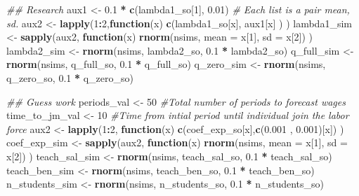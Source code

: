 \documentclass[]{article}
\newenvironment{Shaded}{\begin{snugshade}}{\end{snugshade}}
\newcommand{\CommentTok}[1]{\textcolor[rgb]{0.56,0.35,0.01}{\textit{#1}}}
\newcommand{\ControlFlowTok}[1]{\textcolor[rgb]{0.13,0.29,0.53}{\textbf{#1}}}
\newcommand{\DataTypeTok}[1]{\textcolor[rgb]{0.13,0.29,0.53}{#1}}
\newcommand{\DecValTok}[1]{\textcolor[rgb]{0.00,0.00,0.81}{#1}}
\newcommand{\FloatTok}[1]{\textcolor[rgb]{0.00,0.00,0.81}{#1}}
\newcommand{\KeywordTok}[1]{\textcolor[rgb]{0.13,0.29,0.53}{\textbf{#1}}}
\newcommand{\NormalTok}[1]{#1}
\newcommand{\OperatorTok}[1]{\textcolor[rgb]{0.81,0.36,0.00}{\textbf{#1}}}
\newcommand{\StringTok}[1]{\textcolor[rgb]{0.31,0.60,0.02}{#1}}
\begin{document}
\begin{Shaded}
\begin{Highlighting}[]
{\CommentTok{## Research}
\NormalTok{aux1 <-}\StringTok{ }\FloatTok{0.1} \OperatorTok{*}\StringTok{ }\KeywordTok{c}\NormalTok{(lambda1_so[}\DecValTok{1}\NormalTok{], }\FloatTok{0.01}\NormalTok{)}
\CommentTok{# Each list is a pair mean, sd. }
\NormalTok{aux2 <-}\StringTok{ }\KeywordTok{lapply}\NormalTok{(}\DecValTok{1}\OperatorTok{:}\DecValTok{2}\NormalTok{,}\ControlFlowTok{function}\NormalTok{(x) }\KeywordTok{c}\NormalTok{(lambda1_so[x], aux1[x] ) )}
\NormalTok{lambda1_sim <-}\StringTok{ }\KeywordTok{sapply}\NormalTok{(aux2, }\ControlFlowTok{function}\NormalTok{(x)  }\KeywordTok{rnorm}\NormalTok{(nsims, }\DataTypeTok{mean =}\NormalTok{ x[}\DecValTok{1}\NormalTok{], }\DataTypeTok{sd =}\NormalTok{ x[}\DecValTok{2}\NormalTok{]) ) }
\NormalTok{lambda2_sim <-}\StringTok{          }\KeywordTok{rnorm}\NormalTok{(nsims, lambda2_so,  }\FloatTok{0.1} \OperatorTok{*}\StringTok{ }\NormalTok{lambda2_so)}
\NormalTok{q_full_sim <-}\StringTok{           }\KeywordTok{rnorm}\NormalTok{(nsims, q_full_so, }\FloatTok{0.1} \OperatorTok{*}\StringTok{ }\NormalTok{q_full_so)}
\NormalTok{q_zero_sim <-}\StringTok{           }\KeywordTok{rnorm}\NormalTok{(nsims, q_zero_so, }\FloatTok{0.1} \OperatorTok{*}\StringTok{ }\NormalTok{q_zero_so)}

\CommentTok{## Guess work}
\NormalTok{periods_val <-}\StringTok{ }\DecValTok{50}           \CommentTok{#Total number of periods to forecast wages}
\NormalTok{time_to_jm_val <-}\StringTok{ }\DecValTok{10}        \CommentTok{#Time from intial period until individual join the labor force}
\NormalTok{aux2 <-}\StringTok{ }\KeywordTok{lapply}\NormalTok{(}\DecValTok{1}\OperatorTok{:}\DecValTok{2}\NormalTok{, }\ControlFlowTok{function}\NormalTok{(x) }\KeywordTok{c}\NormalTok{(coef_exp_so[x],}\KeywordTok{c}\NormalTok{(}\FloatTok{0.001}\NormalTok{ , }\FloatTok{0.001}\NormalTok{)[x]) )}
\NormalTok{coef_exp_sim <-}\StringTok{ }\KeywordTok{sapply}\NormalTok{(aux2, }\ControlFlowTok{function}\NormalTok{(x)  }\KeywordTok{rnorm}\NormalTok{(nsims, }\DataTypeTok{mean =}\NormalTok{ x[}\DecValTok{1}\NormalTok{], }\DataTypeTok{sd =}\NormalTok{ x[}\DecValTok{2}\NormalTok{]) )     }
\NormalTok{teach_sal_sim <-}\StringTok{    }\KeywordTok{rnorm}\NormalTok{(nsims, teach_sal_so, }\FloatTok{0.1} \OperatorTok{*}\StringTok{ }\NormalTok{teach_sal_so)}
\NormalTok{teach_ben_sim <-}\StringTok{    }\KeywordTok{rnorm}\NormalTok{(nsims, teach_ben_so, }\FloatTok{0.1} \OperatorTok{*}\StringTok{ }\NormalTok{teach_ben_so)}
\NormalTok{n_students_sim <-}\StringTok{   }\KeywordTok{rnorm}\NormalTok{(nsims, n_students_so, }\FloatTok{0.1} \OperatorTok{*}\StringTok{ }\NormalTok{n_students_so)}

}
\end{Highlighting}
\end{Shaded}
\end{document}
